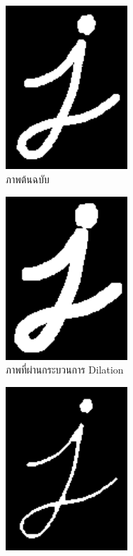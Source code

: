 \documentclass[12pt,oneside,openright,a4paper]{cpe-thai-project}
\begin{document}
\begin{itemize}
\begin{figure}[h!]
\centering
\begin{subfigure}{0.3\textwidth}
\centering
    \includegraphics[width=0.5\textwidth]{images/j.png}
    \caption{ภาพต้นฉบับ}
    \label{fig:first}
\end{subfigure}
\hfill
\begin{subfigure}{0.3\textwidth}
\centering
    \includegraphics[width=0.5\textwidth]{images/dilation.png}
    \caption{ภาพที่ผ่านกระบวนการ Dilation}
    \label{fig:second}
\end{subfigure}
\hfill
\begin{subfigure}{0.3\textwidth}
\centering
    \includegraphics[width=0.5\textwidth]{images/erosion.png}

\end{subfigure}
\end{figure}
\end{itemize}
\end{document}
